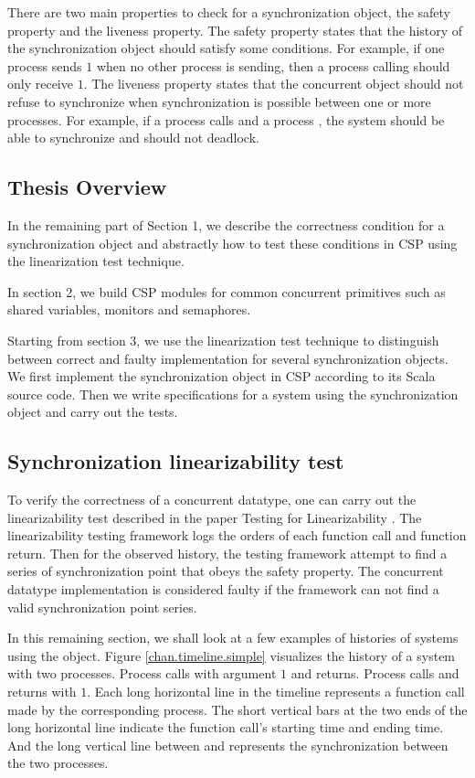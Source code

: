 \documentclass[a4paper, 12pt]{article}
\begin{document}
There are two main properties to check for a synchronization object, the safety property and the liveness property. The safety property states that the history of the synchronization object should satisfy some conditions. For example, if one process sends $1$ when no other process is sending, then a process calling  should only receive $1$. The liveness property states that the concurrent object should not refuse to synchronize when synchronization is possible between one or more processes. For example, if a process calls  and a process , the system should be able to synchronize and should not deadlock. 

\subsection{Thesis Overview}
In the remaining part of Section 1, we describe the correctness condition for a synchronization object and abstractly how to test these conditions in CSP using the linearization test technique. 

In section 2, we build CSP modules for common concurrent primitives such as shared variables, monitors and semaphores.

Starting from section 3, we use the linearization test technique to distinguish between correct and faulty implementation for several synchronization objects. We first implement the synchronization object in CSP according to its Scala source code. Then we write specifications for a system using the synchronization object and carry out the tests.

\subsection{Synchronization linearizability test}
To verify the correctness of a concurrent datatype, one can carry out the linearizability test described in the paper Testing for Linearizability \cite{linearizability-testing}. The linearizability testing framework logs the orders of each function call and function return. Then for the observed history, the testing framework attempt to find a series of synchronization point that obeys the safety property. The concurrent datatype implementation is considered faulty if the framework can not find a valid synchronization point series. 

In this remaining section, we shall look at a few examples of histories of systems using the  object. Figure \ref{chan.timeline.simple} visualizes the history of a system with two processes. Process  calls  with argument $1$ and returns. Process  calls  and returns with $1$. Each long horizontal line in the timeline represents a function call made by the corresponding process. The short vertical bars at the two ends of the long horizontal line indicate the function call's starting time and ending time. And the long vertical line between  and  represents the synchronization between the two processes. 
\end{document}
